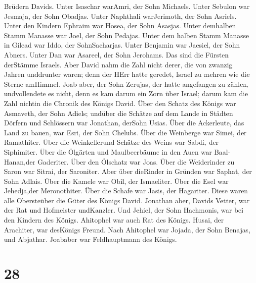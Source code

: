 Brüdern Davids. Unter Isaschar warAmri, der Sohn Michaels. 
Unter Sebulon war Jesmaja, der Sohn Obadjas. Unter Naphthali
warJerimoth, der Sohn Asriels.  Unter den Kindern Ephraim
war Hosea, der Sohn Asasjas. Unter demhalben Stamm Manasse war Joel, der
Sohn Pedajas.  Unter dem halben Stamm Manasse in Gilead war
Iddo, der SohnSacharjas. Unter Benjamin war Jaesiel, der Sohn Abners.
 Unter Dan war Asareel, der Sohn Jerohams. Das sind die
Fürsten derStämme Israels.  Aber David nahm die Zahl nicht
derer, die von zwanzig Jahren unddrunter waren; denn der HErr hatte
geredet, Israel zu mehren wie die Sterne amHimmel.  Joab
aber, der Sohn Zerujas, der hatte angefangen zu zählen, undvollendete es
nicht, denn es kam darum ein Zorn über Israel; darum kam die Zahl
nichtin die Chronik des Königs David.  Über den Schatz des
Königs war Asmaveth, der Sohn Adiels; undüber die Schätze auf dem Lande
in Städten Dörfern und Schlössern war Jonathan, derSohn Usias.
 Über die Ackerleute, das Land zu bauen, war Esri, der Sohn
Chelubs.  Über die Weinberge war Simei, der Ramathiter.
Über die Weinkellerund Schätze des Weins war Sabdi, der Siphimiter.
 Über die Ölgärten und Maulbeerbäume in den Auen war
Baal-Hanan,der Gaderiter. Über den Ölschatz war Joas.  Über
die Weiderinder zu Saron war Sitrai, der Saroniter. Aber über dieRinder
in Gründen war Saphat, der Sohn Adlais.  Über die Kamele
war Obil, der Ismaeliter. Über die Esel war Jehedja,der Meronothiter.
 Über die Schafe war Jasis, der Hagariter. Diese waren alle
Obersteüber die Güter des Königs David.  Jonathan aber,
Davids Vetter, war der Rat und Hofmeister undKanzler. Und Jehiel, der
Sohn Hachmonis, war bei den Kindern des Königs.  Ahitophel
war auch Rat des Königs. Husai, der Arachiter, war desKönigs Freund.
 Nach Ahitophel war Jojada, der Sohn Benajas, und Abjathar.
Joababer war Feldhauptmann des Königs.

\hypertarget{section-27}{%
\section{28}\label{section-27}}

